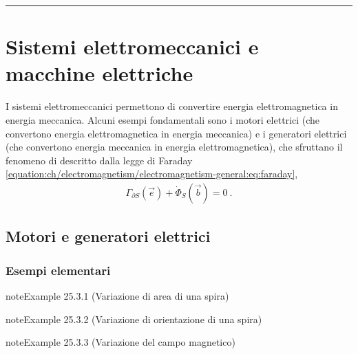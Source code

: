 \documentclass[letterpaper,10pt,italian]{jupyterBook}
\begin{document}
\bigskip\hrule\bigskip


\sphinxstepscope


\section{Sistemi elettromeccanici e macchine elettriche}
\label{\detokenize{ch/electromagnetism/electric-machines:sistemi-elettromeccanici-e-macchine-elettriche}}\label{\detokenize{ch/electromagnetism/electric-machines:physics-hs-electromagnetism-electric-machines}}\label{\detokenize{ch/electromagnetism/electric-machines::doc}}
\sphinxAtStartPar
I sistemi elettromeccanici permettono di convertire energia elettromagnetica in energia meccanica. Alcuni esempi fondamentali sono i motori elettrici (che convertono energia elettromagnetica in energia meccanica) e i generatori elettrici (che convertono energia meccanica in energia elettromagnetica), che sfruttano il fenomeno di {\hyperref[\detokenize{ch/electromagnetism/electromagnetism-general:physics-hs-electromagnetism-electromagnetism-general-em-induction}]{}} descritto dalla legge di Faraday \eqref{equation:ch/electromagnetism/electromagnetism-general:eq:faraday},
\begin{equation*}
\begin{split}\Gamma_{\partial S}(\vec{e}) + \dot{\Phi}_{S}(\vec{b}) = 0 \ .\end{split}
\end{equation*}

\subsection{Motori e generatori elettrici}
\label{\detokenize{ch/electromagnetism/electric-machines:motori-e-generatori-elettrici}}\label{\detokenize{ch/electromagnetism/electric-machines:physics-hs-electromagnetism-electric-machines-motor}}

\subsubsection{Esempi elementari}
\label{\detokenize{ch/electromagnetism/electric-machines:esempi-elementari}}\label{\detokenize{ch/electromagnetism/electric-machines:physics-hs-electromagnetism-electric-machines-motor-simple}}\label{ch/electromagnetism/electric-machines:motor:simple:darea}
\begin{sphinxadmonition}{note}{Example 25.3.1 (Variazione di area di una spira)}


\end{sphinxadmonition}
\label{ch/electromagnetism/electric-machines:motor:simple:dangle}
\begin{sphinxadmonition}{note}{Example 25.3.2 (Variazione di orientazione di una spira)}


\end{sphinxadmonition}
\label{ch/electromagnetism/electric-machines:motor:simple:db}
\begin{sphinxadmonition}{note}{Example 25.3.3 (Variazione del campo magnetico)}


\end{sphinxadmonition}
\end{document}
